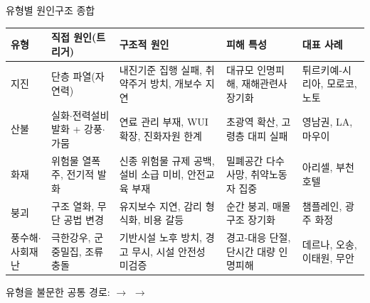 \documentclass[aspectratio=169,10pt]{beamer}
\begin{document}
\begin{frame}{유형별 원인구조 종합}
  \scriptsize
  \begin{tabularx}{\textwidth}{@{}l Y Y Y Y@{}}
    \toprule
    유형 & 직접 원인(트리거) & 구조적 원인 & 피해 특성 & 대표 사례 \\
    \midrule
    지진 & 단층 파열(자연력) & 내진기준 집행 실패, 취약주거 방치, 개보수 지연 & 대규모 인명피해, 재해관련사 장기화 & 튀르키예-시리아, 모로코, 노토 \\
    산불 & 실화$\cdot$전력설비 발화 + 강풍$\cdot$가뭄 & 연료 관리 부재, WUI 확장, 진화자원 한계 & 초광역 확산, 고령층 대피 실패 & 영남권, LA, 마우이 \\
    화재 & 위험물 열폭주, 전기적 발화 & 신종 위험물 규제 공백, 설비 소급 미비, 안전교육 부재 & 밀폐공간 다수 사망, 취약노동자 집중 & 아리셀, 부천 호텔 \\
    붕괴 & 구조 열화, 무단 공법 변경 & 유지보수 지연, 감리 형식화, 비용 갈등 & 순간 붕괴, 매몰 구조 장기화 & 챔플레인, 광주 화정 \\
    풍수해$\cdot$사회재난 & 극한강우, 군중밀집, 조류충돌 & 기반시설 노후 방치, 경고 무시, 시설 안전성 미검증 & 경고-대응 단절, 단시간 대량 인명피해 & 데르나, 오송, 이태원, 무안 \\
    \bottomrule
  \end{tabularx}
  \vspace{8pt}
  \begin{center}
    \small 유형을 불문한 공통 경로:\quad
     $\to$
     $\to$
  \end{center}
\end{frame}
\end{document}
